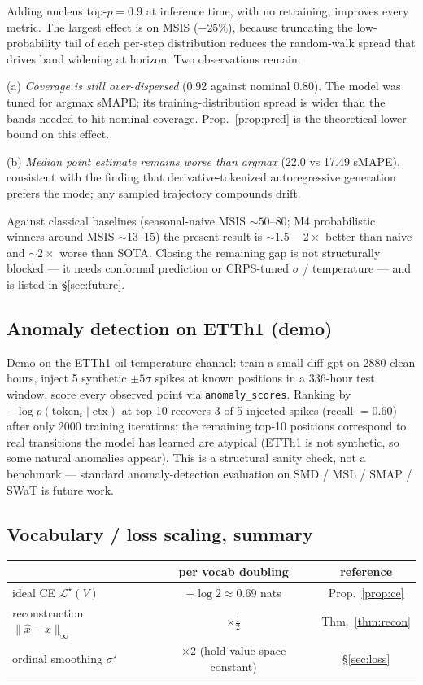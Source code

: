\documentclass[11pt]{article}
\theoremstyle{remark}
\begin{document}
Adding nucleus top-$p = 0.9$ at inference time, with no retraining,
improves every metric. The largest effect is on MSIS ($-25\%$),
because truncating the low-probability tail of each per-step
distribution reduces the random-walk spread that drives band
widening at horizon. Two observations remain:

(a) \emph{Coverage is still over-dispersed} (0.92 against nominal 0.80).
The model was tuned for argmax sMAPE; its training-distribution spread
is wider than the bands needed to hit nominal coverage.
Prop.~\ref{prop:pred} is the theoretical lower bound on this effect.

(b) \emph{Median point estimate remains worse than argmax} (22.0 vs
17.49 sMAPE), consistent with the finding that derivative-tokenized
autoregressive generation prefers the mode; any sampled trajectory
compounds drift.

Against classical baselines (seasonal-naive MSIS $\sim 50$--$80$; M4
probabilistic winners around MSIS $\sim 13$--$15$) the present result
is $\sim 1.5{-}2\times$ better than naive and $\sim 2\times$ worse
than SOTA. Closing the remaining gap is not structurally blocked ---
it needs conformal prediction or CRPS-tuned $\sigma$ / temperature ---
and is listed in \S\ref{sec:future}.

\subsection{Anomaly detection on ETTh1 (demo)}
\label{sec:anom-ett}

Demo on the ETTh1 oil-temperature channel: train a small
diff-gpt on 2880 clean hours, inject 5 synthetic $\pm 5\sigma$ spikes
at known positions in a 336-hour test window, score every observed
point via \texttt{anomaly\_scores}. Ranking by $-\log p(\text{token}_t
\mid \mathrm{ctx})$ at top-10 recovers 3 of 5 injected spikes (recall
$= 0.60$) after only 2000 training iterations; the remaining top-10
positions correspond to real transitions the model has learned are
atypical (ETTh1 is not synthetic, so some natural anomalies appear).
This is a structural sanity check, not a benchmark --- standard
anomaly-detection evaluation on SMD / MSL / SMAP / SWaT is future work.

\subsection{Vocabulary / loss scaling, summary}
\begin{center}
\begin{tabular}{lcc}
\toprule
                         & per vocab doubling & reference \\
\midrule
ideal CE $\mathcal L^\star(V)$   & $+\log 2 \approx 0.69$ nats & Prop.~\ref{prop:ce} \\
reconstruction $\|\hat x - x\|_\infty$ & $\times \tfrac12$ & Thm.~\ref{thm:recon} \\
ordinal smoothing $\sigma^\star$ & $\times 2$ (hold value-space constant) & \S\ref{sec:loss} \\
\bottomrule
\end{tabular}
\end{center}
\end{document}
